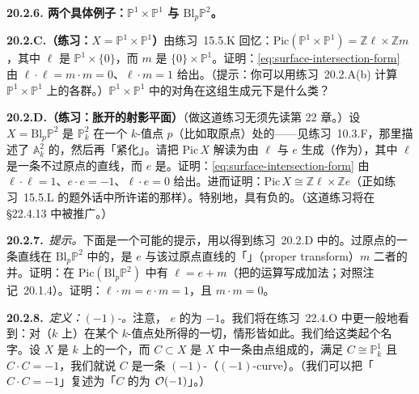 \textbf{20.2.6. 两个具体例子：$\mathbb{P}^1\times\mathbb{P}^1$ 与 $\mathrm{Bl}_p\mathbb{P}^2$。}

\textbf{20.2.C.（练习：$X=\mathbb{P}^1\times\mathbb{P}^1$）}\quad 由\mbox{练习~15.5.K} 回忆：$\mathrm{Pic}(\mathbb{P}^1\times\mathbb{P}^1)=\mathbb{Z}\ell\times\mathbb{Z}m$，其中 $\ell$ 是\trCurve{} $\mathbb{P}^1\times\{0\}$，而 $m$ 是\trCurve{} $\{0\}\times\mathbb{P}^1$。证明：\trIntersectionForm \eqref{eq:surface-intersection-form} 由 $\ell\cdot\ell=m\cdot m=0$、$\ell\cdot m=1$ 给出。（提示：你可以用\mbox{练习~20.2.A(b)} 计算 $\mathbb{P}^1\times\mathbb{P}^1$ 上\trLineBundle{}的各\trCohomology{}群。）$\mathbb{P}^1\times\mathbb{P}^1$ 中的对角在这组生成元下是什么类？

\textbf{20.2.D.（练习：胀开的射影平面）}\quad （做这道练习无须先读第 22 章。）设 $X=\mathrm{Bl}_p\mathbb{P}^2$ 是 $\mathbb{P}^2_k$ 在一个 $k$-值点 $p$（比如取原点）处的\trBlowup——见\mbox{练习~10.3.F}，那里描述了 $\mathbb{A}^2_k$ 的\trBlowup，然后再「紧化」。请把 $\mathrm{Pic}\,X$ 解读为由 $\ell$ 与 $e$ 生成（作为\trAbelianGroups），其中 $\ell$ 是一条不过原点的直线，而 $e$ 是\trExceptionalDivisor。证明：\trIntersectionForm \eqref{eq:surface-intersection-form} 由 $\ell\cdot\ell=1$、$e\cdot e=-1$、$\ell\cdot e=0$ 给出。进而证明：$\mathrm{Pic}\,X\cong\mathbb{Z}\ell\times\mathbb{Z}e$（正如\mbox{练习~15.5.L} 的题外话中所许诺的那样）。特别地，\trExceptionalDivisor{}具有负的\trSelfIntersection。（这道练习将在 \S22.4.13 中被推广。）

\textbf{20.2.7.}\ \emph{提示。}\quad 下面是一个可能的提示，用以得到\mbox{练习~20.2.D} 中的\trIntersectionForm。过原点的一条直线在 $\mathrm{Bl}_p\mathbb{P}^2$ 中的\trSchemeTheoreticPreimage，是\trExceptionalDivisor{} $e$ 与该过原点直线的「\textbf{\trProperTransform}」（proper transform）$m$ 二者的\trSchemeTheoretic{}并。证明：在 $\mathrm{Pic}(\mathrm{Bl}_p\mathbb{P}^2)$ 中有 $\ell=e+m$（把\trPicardGroup{}的运算写成加法；对照\mbox{注记~20.1.4}）。证明：$\ell\cdot m=e\cdot m=1$，且 $m\cdot m=0$。

\textbf{20.2.8.}\ \emph{定义：$(-1)$-\trCurve。}\quad 注意，\trExceptionalDivisor{} $e$ 的\trSelfIntersection{}为 $-1$。我们将在\mbox{练习~22.4.O} 中更一般地看到：对\trSmooth\trSurface{}（$k$ 上）在某个 $k$-值点处\trBlowup{}所得的一切\trExceptionalDivisor，情形皆如此。我们给这类\trCurve{}起个名字。设 $X$ 是 $k$ 上的一个\trSurface，而 $C\subset X$ 是 $X$ 中一条由\trSmooth{}点组成的\trCurve，满足 $C\cong\mathbb{P}^1_k$ 且 $C\cdot C=-1$，我们就说 $C$ 是一条 $(-1)$-\textbf{\trCurve}（$(-1)$-curve）。（我们可以把「$C\cdot C=-1$」复述为「$C$ 的\trNormalBundle{}为 $\mathcal{O}(-1)$」。）

